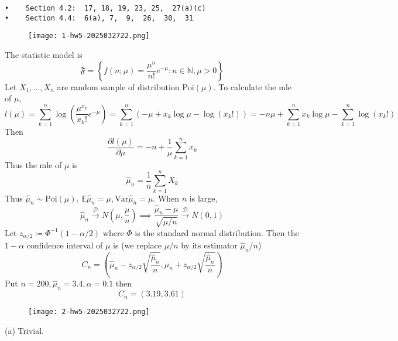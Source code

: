 \begin{lstlisting}
•    Section 4.2:  17, 18, 19, 23, 25,  27(a)(c)  
•    Section 4.4:  6(a), 7,  9,  26,  30,  31    
\end{lstlisting}
\begin{exercise}
\begin{figure}[H]
\centering
\texttt{[image: 1-hw5-2025032722.png]}
\label{}
\end{figure}
\end{exercise}
The statistic model is
\[
\mathfrak{F}=\left\{  f(n;\mu)=\frac{\mu^{n}}{n!}e^{ -\mu }:n\in \mathbb{N},\mu>0  \right\}
\]
Let  $X_1,\dots,X_n$ are random sample of distribution $\text{Poi}(\mu)$. To calculate the mle of $\mu$,
\[
l(\mu)=\sum_{k=1}^{n} \log\left( \frac{\mu^{x_k}}{x_k!}e^{ -\mu } \right)=\sum_{k=1}^{n} (-\mu+x_k\log \mu-\log(x_k!))=-n\mu+\sum_{k=1}^{n} x_k\log \mu-\sum_{k=1}^{n} \log(x_k!)
\]
Then
\[
\frac{ \partial l(\mu) }{ \partial \mu } =-n+\frac{1}{\mu}\sum_{k=1}^{n} x_k
\]
Thus the mle of $\mu$ is
\[
\widehat{\mu}_n=\frac{1}{n}\sum_{k=1}^{n} X_k
\]
Thus $\widehat{\mu}_n\sim\text{Poi}(\mu)$. $\mathbb{E}\widehat{\mu}_n=\mu,\mathrm{Var}\widehat{\mu}_n=\mu$. When $n$ is large,
\[
\widehat{\mu}_n\overset{ \mathcal{D} }{ \to } N\left( \mu,\frac{\mu}{n} \right)\implies\frac{\widehat{\mu}_n-\mu}{\sqrt{ \mu/n  }}\overset{ \mathcal{D} }{ \to } N(0,1)
\]
Let $z_{\alpha/2 }\coloneqq \Phi ^{-1}(1-\alpha/2 )$ where $\Phi$ is the standard normal distribution. Then the $1-\alpha$ confidence interval of $\mu$ is (we replace $\mu/n$ by its estimator $\widehat{\mu}_n/n$)
\[
C_n=\left( \widehat{\mu}_n-z_{\alpha/2 }\sqrt{ \frac{\widehat{\mu}_{n}}{n} },\widehat{\mu}_n+z_{\alpha/2 }\sqrt{ \frac{\widehat{\mu}_n}{n} } \right)
\]
Put $n=200,\widehat{\mu}_n=3.4,\alpha=0.1$ then
\[
C_n=(3.19,3.61)
\]
\begin{exercise}
\begin{figure}[H]
\centering
\texttt{[image: 2-hw5-2025032722.png]}
\label{}
\end{figure}
\end{exercise}
(a) Trivial.

